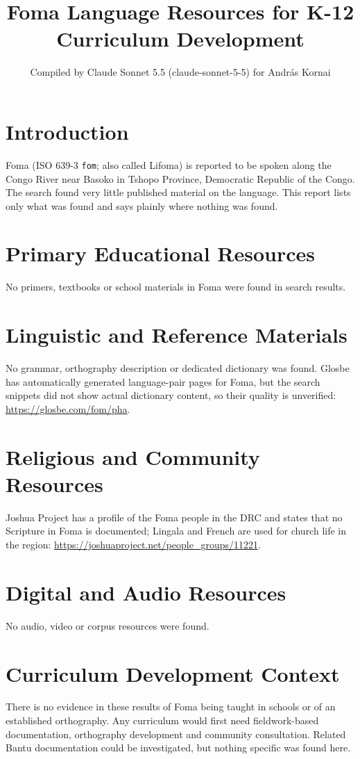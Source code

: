 \documentclass[12pt]{article}
\title{Foma Language Resources for K-12 Curriculum Development}
\author{Compiled by Claude Sonnet 5.5 (claude-sonnet-5-5) for Andr\'as Kornai}
\date{}
\begin{document}
\maketitle

\section{Introduction}
Foma (ISO 639-3 \texttt{fom}; also called Lifoma) is reported to be spoken along the Congo River near Basoko in Tshopo Province, Democratic Republic of the Congo. The search found very little published material on the language. This report lists only what was found and says plainly where nothing was found.

\section{Primary Educational Resources}
No primers, textbooks or school materials in Foma were found in search results.

\section{Linguistic and Reference Materials}
No grammar, orthography description or dedicated dictionary was found. Glosbe has automatically generated language-pair pages for Foma, but the search snippets did not show actual dictionary content, so their quality is unverified: \url{https://glosbe.com/fom/pha}.

\section{Religious and Community Resources}
Joshua Project has a profile of the Foma people in the DRC and states that no Scripture in Foma is documented; Lingala and French are used for church life in the region: \url{https://joshuaproject.net/people_groups/11221}.

\section{Digital and Audio Resources}
No audio, video or corpus resources were found.

\section{Curriculum Development Context}
There is no evidence in these results of Foma being taught in schools or of an established orthography. Any curriculum would first need fieldwork-based documentation, orthography development and community consultation. Related Bantu documentation could be investigated, but nothing specific was found here.
\end{document}
